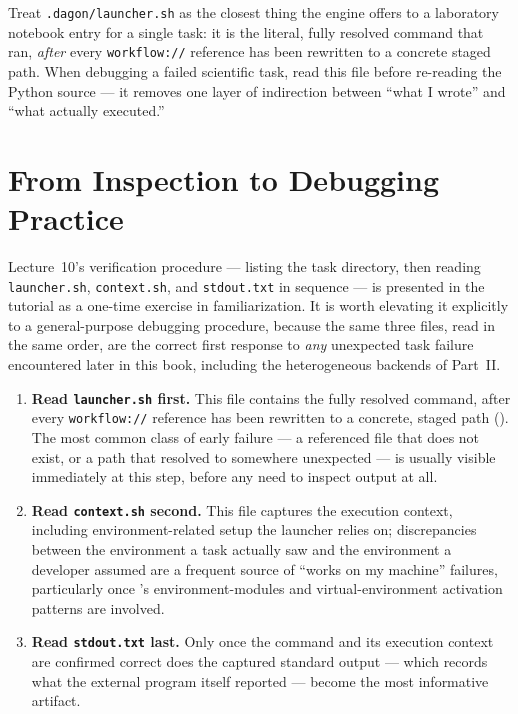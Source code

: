 \begin{practicebox}
Treat \texttt{.dagon/launcher.sh} as the closest thing the engine offers to a
laboratory notebook entry for a single task: it is the literal, fully
resolved command that ran, \emph{after} every \texttt{workflow://} reference
has been rewritten to a concrete staged path. When debugging a failed
scientific task, read this file before re-reading the Python source --- it
removes one layer of indirection between ``what I wrote'' and ``what
actually executed.''
\end{practicebox}

\section{From Inspection to Debugging Practice}

Lecture~10's verification procedure --- listing the task directory, then
reading \texttt{launcher.sh}, \texttt{context.sh}, and \texttt{stdout.txt}
in sequence --- is presented in the tutorial as a one-time exercise in
familiarization. It is worth elevating it explicitly to a general-purpose
debugging procedure, because the same three files, read in the same order,
are the correct first response to \emph{any} unexpected task failure
encountered later in this book, including the heterogeneous backends of
Part~II.

\begin{enumerate}[leftmargin=1.8em]
  \item \textbf{Read \texttt{launcher.sh} first.} This file contains the
    fully resolved command, after every \texttt{workflow://} reference has
    been rewritten to a concrete, staged path (). The most
    common class of early failure --- a referenced file that does not
    exist, or a path that resolved to somewhere unexpected --- is usually
    visible immediately at this step, before any need to inspect output at
    all.
  \item \textbf{Read \texttt{context.sh} second.} This file captures the
    execution context, including environment-related setup the launcher
    relies on; discrepancies between the environment a task actually saw
    and the environment a developer assumed are a frequent source of
    ``works on my machine'' failures, particularly once
    's environment-modules and virtual-environment
    activation patterns are involved.
  \item \textbf{Read \texttt{stdout.txt} last.} Only once the command and
    its execution context are confirmed correct does the captured standard
    output --- which records what the external program itself reported ---
    become the most informative artifact.
\end{enumerate}


